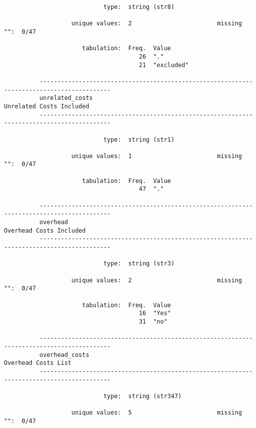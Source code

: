 \documentclass{article}
\begin{document}
\begin{verbatim}
                            type:  string (str8)
          
                   unique values:  2                        missing "":  0/47
          
                      tabulation:  Freq.  Value
                                      26  "."
                                      21  "excluded"
          
          ------------------------------------------------------------------------------------------
          unrelated_costs                                                   Unrelated Costs Included
          ------------------------------------------------------------------------------------------
          
                            type:  string (str1)
          
                   unique values:  1                        missing "":  0/47
          
                      tabulation:  Freq.  Value
                                      47  "."
          
          ------------------------------------------------------------------------------------------
          overhead                                                           Overhead Costs Included
          ------------------------------------------------------------------------------------------
          
                            type:  string (str3)
          
                   unique values:  2                        missing "":  0/47
          
                      tabulation:  Freq.  Value
                                      16  "Yes"
                                      31  "no"
          
          ------------------------------------------------------------------------------------------
          overhead_costs                                                         Overhead Costs List
          ------------------------------------------------------------------------------------------
          
                            type:  string (str347)
          
                   unique values:  5                        missing "":  0/47
          

\end{verbatim}
\end{document}
